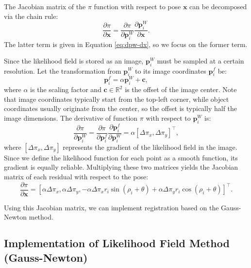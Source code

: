 The Jacobian matrix of the $\pi$ function with respect to pose $\mathbf{x}$ can be decomposed via the chain rule:
\begin{equation}\label{key}
	\frac{\partial \pi}{\partial \mathbf{x}} = \frac{\partial \pi}{\partial \mathbf{p}^W_i} \frac{\partial \mathbf{p}^W_i}{\partial \mathbf{x}}.
\end{equation}
The latter term is given in Equation \eqref{eq:dpw-dx}, so we focus on the former term.

Since the likelihood field is stored as an image, $\mathbf{p}^W_i$ must be sampled at a certain resolution. Let the transformation from $\mathbf{p}^W_i$ to its image coordinates $\mathbf{p}^f_i$ be:
\begin{equation}\label{key}
	\mathbf{p}^f_i = \alpha \mathbf{p}^W_i + \mathbf{c},
\end{equation}
where $\alpha$ is the scaling factor and $\mathbf{c} \in \mathbb{R}^2$ is the offset of the image center. Note that image coordinates typically start from the top-left corner, while object coordinates usually originate from the center, so the offset is typically half the image dimensions. The derivative of function $\pi$ with respect to $\mathbf{p}^W_i$ is:
\begin{equation}\label{key}
	\frac{\partial \pi}{\partial \mathbf{p}^W_i} = \frac{\partial \pi}{\partial \mathbf{p}^f_i} \frac{\partial \mathbf{p}^f_i}{\partial \mathbf{p}^W_i}= \alpha [\Delta \pi_x, \Delta \pi_y]^\top,
\end{equation}
where $[\Delta \pi_x, \Delta \pi_y]$ represents the gradient of the likelihood field in the image. Since we define the likelihood function for each point as a smooth function, its gradient is equally reliable. Multiplying these two matrices yields the Jacobian matrix of each residual with respect to the pose:
\begin{equation}\label{key}
	\frac{\partial \pi}{\partial \mathbf{x}} = [\alpha \Delta \pi_x, \alpha \Delta \pi_y, -\alpha \Delta \pi_x r_i \sin(\rho_i+\theta) + \alpha \Delta \pi_y r_i \cos(\rho_i +\theta)]^\top.
\end{equation}

Using this Jacobian matrix, we can implement registration based on the Gauss-Newton method.

\subsection{Implementation of Likelihood Field Method (Gauss-Newton)}  

